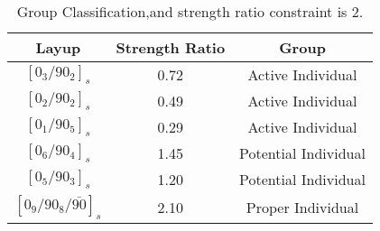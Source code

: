 \begin{table}[ht]
\caption{Group Classification,and strength ratio constraint is 2. }
\centering
\begin{adjustbox}{width=1\textwidth}
\label{tab:mat}
\begin{tabular}{ccc}
\toprule
Layup							 	       & Strength Ratio    & Group                \\
\midrule
$[0_{3}/90_{2}]_s$                		   & 0.72             & Active  Individual       \\
$[0_{2}/90_{2}]_s$                		   & 0.49             & Active  Individual       \\
$[0_{1}/90_{5}]_s$                		   & 0.29             & Active  Individual       \\
$[0_{6}/90_{4}]_s$                		   & 1.45             & Potential Individual       \\
$[0_{5}/90_{3}]_s$                		   & 1.20             & Potential Individual       \\
$[0_{9}/90_{8}/\bar{90}]_s$                & 2.10             & Proper Individual \\
\bottomrule
\end{tabular}
\end{adjustbox}
\end{table}
